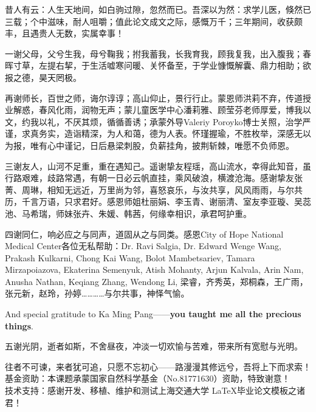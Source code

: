 \begin{thanks}
  昔人有云：人生天地间，如白驹过隙，忽然而已。吾深以为然：求学儿医，倏然已三载；个中滋味，耐人咀嚼；值此论文成文之际，感慨万千；三年期间，收获颇丰，且遇贵人无数，实属幸事！

  一谢父母，父兮生我，母兮鞠我；拊我蓄我，长我育我，顾我复我，出入腹我；春晖寸草，左提右挈，于生活嘘寒问暖、关怀备至，于学业慷慨解囊、鼎力相助；欲报之德，昊天罔极。

  再谢师长，百世之师，诲尔谆谆；高山仰止，景行行止。蒙恩师洪莉不弃，传道授业解惑，春风化雨，润物无声；蒙儿童医学中心潘莉雅、顾莹芬老师厚爱，博我以文，约我以礼，不厌其烦，循循善诱；承蒙外导Valeriy Poroyko博士关照，治学严谨，求真务实，造诣精深，为人和蔼，德为人表。怀瑾握瑜，不胜枚举，深感无以为报，唯有心中谨记，日后悬梁刺股，负薪挂角，披荆斩棘，唯愿不负师恩。

  三谢友人，山河不足重，重在遇知己。遥谢挚友程瑶，高山流水，幸得此知音，虽行路艰难，歧路常遇，有朝一日必云帆直挂，乘风破浪，横渡沧海。感谢挚友张菁、周琳，相知无远近，万里尚为邻，喜怒哀乐，与汝共享，风风雨雨，与尔共历，千言万语，只求君好。感恩师姐杜丽娟、李玉青、谢丽清、室友李亚璇、吴蕊池、马希瑞，师妹张卉、朱媛、韩茜，何缘幸相识，承君呵护重。

  四谢同仁，响必应之与同声，道固从之与同类。感恩City of Hope National Medical Center各位无私帮助：Dr. Ravi Salgia, Dr. Edward Wenge Wang, Prakash Kulkarni, Chong Kai Wang, Bolot Mambetsariev, Tamara Mirzapoiazova, Ekaterina Semenyuk, Atish Mohanty, Arjun Kalvala, Arin Nam, Anusha Nathan, Keqiang Zhang, Wendong Li, 梁睿，齐秀英，郑桐森，王广雨，张元新，赵玲，孙婷…………与尔共事，神怿气愉。

  And special gratitude to Ka Ming Pang——\textbf{you taught me all the precious things}.

  五谢光阴，逝者如斯，不舍昼夜，冲淡一切欢愉与苦难，带来所有宽慰与光明。

  往者不可谏，来者犹可追，只愿不忘初心——路漫漫其修远兮，吾将上下而求索！\\
  基金资助：本课题承蒙国家自然科学基金（No.81771630）资助，特致谢意！\\
  技术支持：感谢开发、移植、维护和测试上海交通大学 \LaTeX 毕业论文模板之诸君！\\
\end{thanks}
